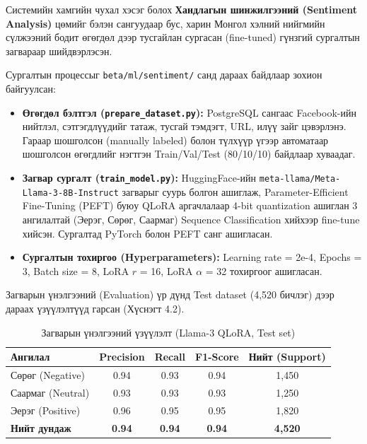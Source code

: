 \documentclass[
12pt,
oneside,
english,
onehalfspacing,
nolistspacing,
headsepline,
]{MUST-Thesis}
\begin{document}
Системийн хамгийн чухал хэсэг болох \textbf{Хандлагын шинжилгээний (Sentiment Analysis)} цөмийг бэлэн сангуудаар бус, харин Монгол хэлний нийгмийн сүлжээний бодит өгөгдөл дээр тусгайлан сургасан (fine-tuned) гүнзгий сургалтын загвараар шийдвэрлэсэн.

Сургалтын процессыг \texttt{beta/ml/sentiment/} санд дараах байдлаар зохион байгуулсан:
\begin{itemize}
    \item \textbf{Өгөгдөл бэлтгэл (\texttt{prepare\_dataset.py}):} PostgreSQL сангаас Facebook-ийн нийтлэл, сэтгэгдлүүдийг татаж, тусгай тэмдэгт, URL, илүү зайг цэвэрлэнэ. Гараар шошголсон (manually labeled) болон түлхүүр үгээр автоматаар шошголсон өгөгдлийг нэгтгэн Train/Val/Test (80/10/10) байдлаар хуваадаг.
    \item \textbf{Загвар сургалт (\texttt{train\_model.py}):} HuggingFace-ийн \texttt{meta-llama/Meta-Llama-3-8B-Instruct} загварыг суурь болгон ашиглаж, Parameter-Efficient Fine-Tuning (PEFT) буюу QLoRA аргачлалаар 4-bit quantization ашиглан 3 ангилалтай (Эерэг, Сөрөг, Саармаг) Sequence Classification хийхээр fine-tune хийсэн. Сургалтад PyTorch болон PEFT санг ашигласан.
    \item \textbf{Сургалтын тохиргоо (Hyperparameters):} Learning rate = 2e-4, Epochs = 3, Batch size = 8, LoRA $r$ = 16, LoRA $\alpha$ = 32 тохиргоог ашигласан.
\end{itemize}

Загварын үнэлгээний (Evaluation) үр дүнд Test dataset (4,520 бичлэг) дээр дараах үзүүлэлтүүд гарсан (Хүснэгт 4.2).

\begin{table}[H]
\centering
\caption{Загварын үнэлгээний үзүүлэлт (Llama-3 QLoRA, Test set)}
\small
\renewcommand{\arraystretch}{1.28}
\begin{adjustbox}{max width=0.8\textwidth}
\begin{tabular}{|L{3cm}|c|c|c|c|}
\hline
{}\textbf{Ангилал} & \textbf{Precision} & \textbf{Recall} & \textbf{F1-Score} & \textbf{Нийт (Support)} \\
\hline
Сөрөг (Negative) & 0.94 & 0.93 & 0.94 & 1,450 \\
\hline
Саармаг (Neutral) & 0.93 & 0.93 & 0.93 & 1,250 \\
\hline
Эерэг (Positive) & 0.96 & 0.95 & 0.95 & 1,820 \\
\hline
{}\textbf{Нийт дундаж} & \textbf{0.94} & \textbf{0.94} & \textbf{0.94} & \textbf{4,520} \\
\hline
\end{tabular}
\end{adjustbox}
\end{table}
\end{document}
